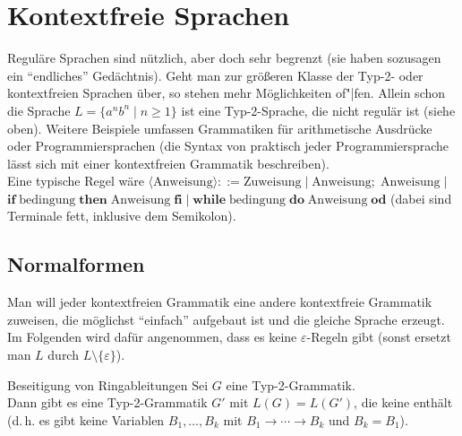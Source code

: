 \chapter{%
    Kontextfreie Sprachen%
}

\begin{Bem}
    Reguläre Sprachen sind nützlich, aber doch sehr begrenzt
    (sie haben sozusagen ein "`endliches"' Gedächtnis).
    Geht man zur größeren Klasse der Typ-2- oder kontextfreien Sprachen über,
    so stehen mehr Möglichkeiten of"|fen.
    Allein schon die Sprache $L = \{a^n b^n \;|\; n \ge 1\}$ ist eine
    Typ-2-Sprache, die nicht regulär ist (siehe oben).
    Weitere Beispiele umfassen Grammatiken für arithmetische Ausdrücke
    oder Programmiersprachen (die Syntax von praktisch jeder Programmiersprache
    lässt sich mit einer kontextfreien Grammatik beschreiben).\\
    Eine typische Regel wäre $\langle\text{Anweisung}\rangle ::=
    \text{Zuweisung} \;|\;
    \text{Anweisung}\mathbf{;}\; \text{Anweisung} \;|\;$\\
    $\mathbf{if}\; \text{bedingung}\; \mathbf{then}\; \text{Anweisung}\;
    \mathbf{fi} \;|\;
    \mathbf{while}\; \text{bedingung}\; \mathbf{do}\; \text{Anweisung}\;
    \mathbf{od}$
    (dabei sind Terminale fett, inklusive dem Semikolon).
\end{Bem}

\section{%
    Normalformen%
}

\begin{Bem}
    Man will jeder kontextfreien Grammatik eine andere
    kontextfreie Grammatik zuweisen, die möglichst
    "`einfach"' aufgebaut ist und die gleiche Sprache erzeugt.\\
    Im Folgenden wird dafür angenommen, dass es keine $\varepsilon$-Regeln
    gibt (sonst ersetzt man $L$ durch $L \setminus \{\varepsilon\}$).
\end{Bem}

\begin{Lemma}{Beseitigung von Ringableitungen}
    Sei $G$ eine Typ-2-Grammatik.\\
    Dann gibt es eine Typ-2-Grammatik $G'$ mit $L(G) = L(G')$, die keine
     enthält
    (d.\,h. es gibt keine Variablen $B_1, \dotsc, B_k$ mit
    $B_1 \rightarrow \dotsb \rightarrow B_k$ und $B_k = B_1$).
\end{Lemma}

